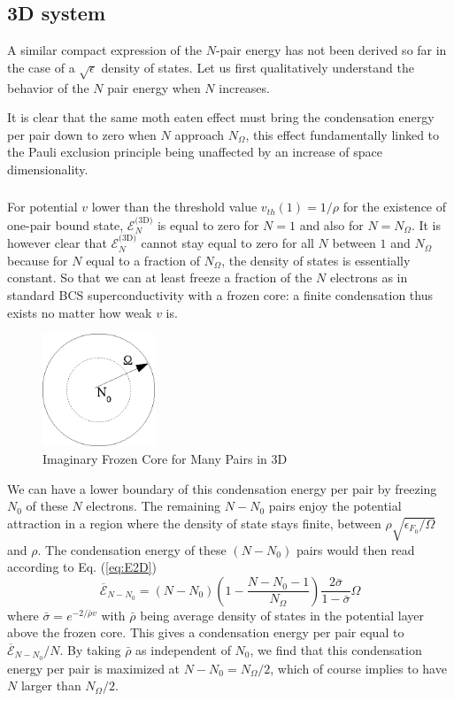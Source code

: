 \documentclass{article}
\newcommand{\sd}{{\ensuremath{{\text{(3D)}}}}}
\begin{document}
\subsection{3D system}
A similar compact expression of the $N$-pair energy has not been derived so far in the case of a $\sqrt{\epsilon}$ density of states. Let us first qualitatively understand the behavior of the $N$ pair energy when $N$ increases. 

It is clear that the same moth eaten effect must bring the condensation energy per pair down to zero when $N$ approach $N_\Omega$, this effect fundamentally linked to the Pauli exclusion principle being unaffected by an increase of space dimensionality. 

\subsubsection{}
For potential $v$ lower than the threshold value $v_{th}(1)=1/\rho$ for the existence of one-pair bound state, $\mathcal{E}_N^\sd$ is equal to zero for $N=1$ and also for $N=N_\Omega$.  It is however clear that $\mathcal{E}_N^\sd$ cannot stay equal to zero for all $N$ between $1$ and $N_\Omega$ because for $N$ equal to a fraction of $N_\Omega$, the density of states is essentially constant.  So that we can at least freeze a fraction of the $N$ electrons as in standard BCS superconductivity with a frozen core: a finite condensation thus exists no matter how weak $v$ is. 

\begin{figure}[htbp]
	\centering
		\includegraphics[width=0.30\textwidth]{potential.eps}
	\caption{Imaginary Frozen Core for Many Pairs in 3D}
	\label{fig:potential}
\end{figure}

We can have a lower boundary of this condensation energy per pair by freezing $N_0$ of these $N$ electrons.  The remaining $N-N_0$ pairs enjoy the potential attraction in a region where the density of state stays finite, between $\rho\sqrt{\epsilon_{F_0}/\Omega}$ and $\rho$.  The condensation energy of these $(N-N_0)$ pairs would then read according to Eq. (\ref{eq:E2D})
\begin{equation}\label{eq:E2D}
 \overline{\mathcal{E}}_{N-N_0}=(N-N_0)(1-\frac{N-N_0-1}{N_\Omega})\frac{2\bar\sigma}{1-\bar\sigma}\Omega
\end{equation}
where $\bar{\sigma}=e^{-2/{\bar{\rho}v}}$ with $\bar\rho$ being average density of states in the potential layer above the frozen core. This gives a condensation energy per pair equal to $\overline{\mathcal{E}}_{N-N_0}/N$.  By taking $\bar\rho$ as independent of $N_0$, we find that this condensation energy per pair is maximized at $N-N_0=N_\Omega/2$, which of course implies to have $N$ larger than $N_\Omega/2$.
\end{document}
